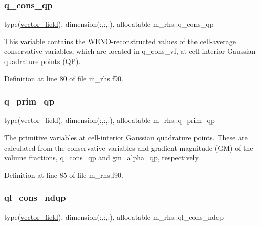 \subsubsection{\texorpdfstring{q\+\_\+cons\+\_\+qp}{q\_cons\_qp}}
{\footnotesize\ttfamily type(\hyperlink{structm__derived__types_1_1vector__field}{vector\+\_\+field}), dimension(\+:,\+:,\+:), allocatable m\+\_\+rhs\+::q\+\_\+cons\+\_\+qp}



This variable contains the W\+E\+N\+O-\/reconstructed values of the cell-\/average conservative variables, which are located in q\+\_\+cons\+\_\+vf, at cell-\/interior Gaussian quadrature points (QP). 



Definition at line 80 of file m\+\_\+rhs.\+f90.

\mbox{\label{namespacem__rhs_af2af2a542d5af4fec546eda34af4ef74}} 
\subsubsection{\texorpdfstring{q\+\_\+prim\+\_\+qp}{q\_prim\_qp}}
{\footnotesize\ttfamily type(\hyperlink{structm__derived__types_1_1vector__field}{vector\+\_\+field}), dimension(\+:,\+:,\+:), allocatable m\+\_\+rhs\+::q\+\_\+prim\+\_\+qp}



The primitive variables at cell-\/interior Gaussian quadrature points. These are calculated from the conservative variables and gradient magnitude (GM) of the volume fractions, q\+\_\+cons\+\_\+qp and gm\+\_\+alpha\+\_\+qp, respectively. 



Definition at line 85 of file m\+\_\+rhs.\+f90.

\mbox{\label{namespacem__rhs_abe42bc1610e9369b701122a870fed48d}} 
\subsubsection{\texorpdfstring{ql\+\_\+cons\+\_\+ndqp}{ql\_cons\_ndqp}}
{\footnotesize\ttfamily type(\hyperlink{structm__derived__types_1_1vector__field}{vector\+\_\+field}), dimension(\+:,\+:,\+:), allocatable m\+\_\+rhs\+::ql\+\_\+cons\+\_\+ndqp}



